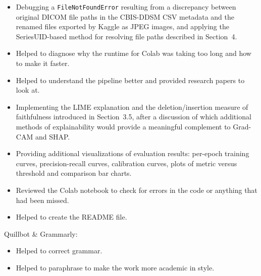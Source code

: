 \begin{itemize}
  \item Debugging a \texttt{FileNotFoundError} resulting from a discrepancy between original DICOM file paths in the CBIS-DDSM CSV metadata and the renamed files exported by Kaggle as JPEG images, and applying the SeriesUID-based method for resolving file paths described in Section~4.
  \item Helped to diagnose why the runtime for Colab was taking too long and how to make it faster.
  \item Helped to understand the pipeline better and provided research papers to look at.
  \item Implementing the LIME explanation and the deletion/insertion measure of faithfulness introduced in Section~3.5, after a discussion of which additional methods of explainability would provide a meaningful complement to Grad-CAM and SHAP.
  \item Providing additional visualizations of evaluation results: per-epoch training curves, precision-recall curves, calibration curves, plots of metric versus threshold and comparison bar charts.
  \item Reviewed the Colab notebook to check for errors in the code or anything that had been missed.
  \item Helped to create the README file.
\end{itemize}

Quillbot \& Grammarly:
\begin{itemize}
  \item Helped to correct grammar.
  \item Helped to paraphrase to make the work more academic in style.
\end{itemize}




